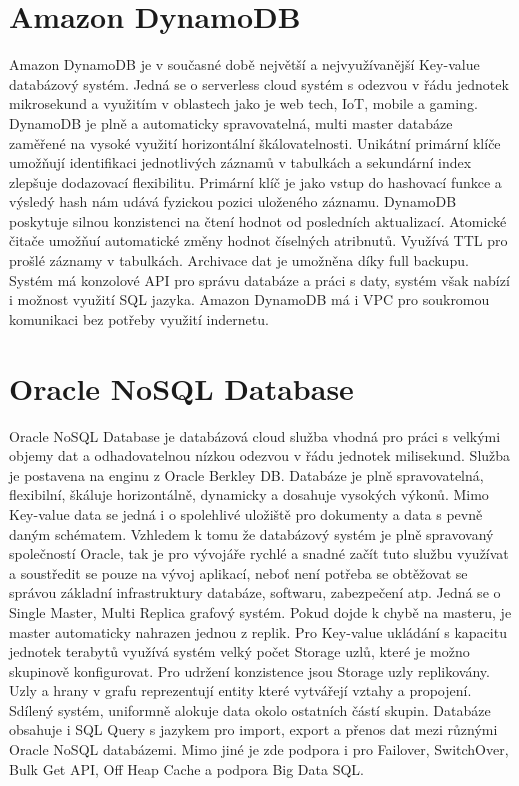 \documentclass[czech,bachelor,dept460,male,csharp,cpdeclaration]{diploma}
\begin{document}
	\section{Amazon DynamoDB}
	
	Amazon DynamoDB\cite{dynamodb} je v současné době největší a nejvyužívanější Key-value databázový systém. Jedná se o serverless cloud systém s odezvou v řádu jednotek mikrosekund a využitím v oblastech jako je web tech, IoT, mobile a gaming. DynamoDB je plně a automaticky spravovatelná, multi master databáze zaměřené na vysoké využití horizontální škálovatelnosti. Unikátní primární klíče umožňují identifikaci jednotlivých záznamů v tabulkách a sekundární index zlepšuje dodazovací flexibilitu. Primární klíč je jako vstup do hashovací funkce a výsledý hash nám udává fyzickou pozici uloženého záznamu. DynamoDB poskytuje silnou konzistenci na čtení hodnot od posledních aktualizací. Atomické čitače umožňuí automatické změny hodnot číselných atribnutů. Využívá TTL pro prošlé záznamy v tabulkách. Archivace dat je umožněna díky full backupu. Systém má konzolové API pro správu databáze a práci s daty, systém však nabízí i možnost využití SQL jazyka. Amazon DynamoDB má i VPC pro soukromou komunikaci bez potřeby využití indernetu.
		
	\section{Oracle NoSQL Database}
	
	Oracle NoSQL Database\cite{oraclenosqldb} je databázová cloud služba vhodná pro práci s velkými objemy dat a odhadovatelnou nízkou odezvou v řádu jednotek milisekund. Služba je postavena na enginu z Oracle Berkley DB. Databáze je plně spravovatelná, flexibilní, škáluje horizontálně, dynamicky a dosahuje vysokých výkonů. Mimo Key-value data se jedná i o spolehlivé uložiště pro dokumenty a data s pevně daným schématem. Vzhledem k tomu že databázový systém je plně spravovaný společností Oracle, tak je pro vývojáře rychlé a snadné začít tuto službu využívat a soustředit se pouze na vývoj aplikací, neboť není potřeba se obtěžovat se správou základní infrastruktury databáze, softwaru, zabezpečení atp. Jedná se o Single Master, Multi Replica grafový systém. Pokud dojde k chybě na masteru, je master automaticky nahrazen jednou z replik. Pro Key-value ukládání s kapacitu jednotek terabytů využívá systém velký počet Storage uzlů, které je možno skupinově konfigurovat. Pro udržení konzistence jsou Storage uzly replikovány. Uzly a hrany v grafu reprezentují entity které vytvářejí vztahy a propojení. Sdílený systém, uniformně alokuje data okolo ostatních částí skupin. Databáze obsahuje i SQL Query s jazykem pro import, export a přenos dat mezi různými Oracle NoSQL databázemi. Mimo jiné je zde podpora i pro Failover, SwitchOver, Bulk Get API, Off Heap Cache a podpora Big Data SQL.
		
\end{document}

